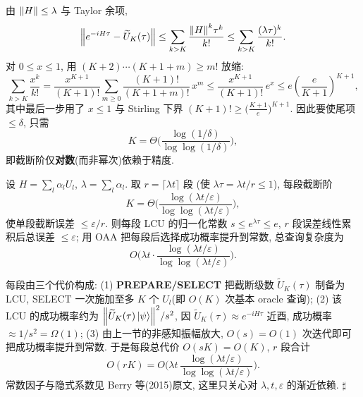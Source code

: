 \documentclass[utf8]{article} %
\numberwithin{equation}{section}   %
\newtheorem{Thm}{\hskip 2em {\color{blue} 定理}}[subsection]
\newtheorem{Note}{\hskip 2em {\color{red} 注}}[subsection]
\newenvironment{Proof}[1][\relax]{{\noindent\it Proof\ifx\relax#1\relax\else\ (#1)\fi:}\quad}{\hfill $\sharp$\par}
\begin{document}
\begin{Note}[截断误差与截断阶的选取]
    由 $\norm{H}\le\lambda$ 与 Taylor 余项,
    \begin{equation}
        \norm{e^{-iH\tau}-\widetilde U_K(\tau)}
        \le \sum_{k>K}\frac{\norm{H}^k\tau^k}{k!}
        \le \sum_{k>K}\frac{(\lambda\tau)^k}{k!}.
    \end{equation}
    对 $0\le x\le1$, 用 $(K+2)\cdots(K+1+m)\ge m!$ 放缩:
    \begin{equation}
        \sum_{k>K}\frac{x^k}{k!} = \frac{x^{K+1}}{(K+1)!}\sum_{m\ge0}\frac{(K+1)!}{(K+1+m)!}\,x^m
        \le \frac{x^{K+1}}{(K+1)!}\,e^{x}
        \le e\left(\frac{e}{K+1}\right)^{K+1},
    \end{equation}
    其中最后一步用了 $x\le1$ 与 Stirling 下界 $(K+1)!\ge\big(\frac{K+1}{e}\big)^{K+1}$.
    因此要使尾项 $\le\delta$, 只需
    \[ K = \Theta\Big(\frac{\log(1/\delta)}{\log\log(1/\delta)}\Big), \]
    即截断阶仅\textbf{对数}(而非幂次)依赖于精度.
\end{Note}

\begin{Thm}
    设 $H = \sum_l\alpha_l U_l$, $\lambda = \sum_l\alpha_l$. 取 $r = \lceil\lambda t\rceil$ 段
    (使 $\lambda\tau = \lambda t/r \le 1$), 每段截断阶
    \begin{equation}
        K = \Theta\Big(\frac{\log(\lambda t/\varepsilon)}{\log\log(\lambda t/\varepsilon)}\Big),
    \end{equation}
    使单段截断误差 $\le \varepsilon/r$. 则每段 LCU 的归一化常数 $s \le e^{\lambda\tau}\le e$,
    $r$ 段误差线性累积后总误差 $\le \varepsilon$; 用 OAA 把每段后选择成功概率提升到常数,
    总查询复杂度为
    \begin{equation}
        \boxed{O\!\Big(\lambda t \cdot \frac{\log(\lambda t/\varepsilon)}{\log\log(\lambda t/\varepsilon)}\Big)}.
    \end{equation}
\end{Thm}

\begin{Proof}[复杂度核算]
    每段由三个代价构成: (1) \textbf{PREPARE/SELECT} 把截断级数 $\widetilde U_K(\tau)$
    制备为 LCU, SELECT 一次施加至多 $K$ 个 $U_l$(即 $O(K)$ 次基本 oracle 查询);
    (2) 该 LCU 的成功概率约为 $\norm{\widetilde U_K(\tau)\ket{\psi}}^2/s^2$,
    因 $\widetilde U_K(\tau)\approx e^{-iH\tau}$ 近酉, 成功概率 $\approx 1/s^2=\Omega(1)$;
    (3) 由上一节的非感知振幅放大, $O(s)=O(1)$ 次迭代即可把成功概率提升到常数.
    于是每段总代价 $O(sK)=O(K)$, $r$ 段合计
    \begin{equation}
        O(rK) = O\!\Big(\lambda t\,\frac{\log(\lambda t/\varepsilon)}{\log\log(\lambda t/\varepsilon)}\Big).
    \end{equation}
    常数因子与隐式系数见 Berry 等(2015)原文, 这里只关心对 $\lambda, t, \varepsilon$ 的渐近依赖.
\end{Proof}
\end{document}
